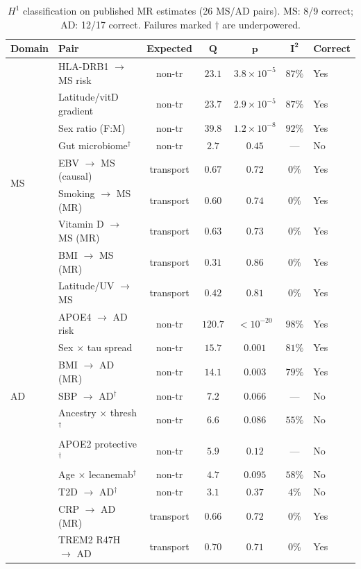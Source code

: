 \documentclass{article}
\begin{document}
\begin{table}[t]
\centering
\caption{$H^1$ classification on published MR estimates (26 MS/AD pairs). MS: 8/9 correct; AD: 12/17 correct. Failures marked $\dagger$ are underpowered.}
\label{tab:realdata-h1}
\small
\begin{tabular}{@{}llccccl@{}}
\toprule
\textbf{Domain} & \textbf{Pair} & \textbf{Expected} & $\boldsymbol{Q}$ & $\boldsymbol{p}$ & $\boldsymbol{I^2}$ & \textbf{Correct} \\
\midrule
\multirow{9}{*}{MS}
& HLA-DRB1 $\to$ MS risk & non-tr & $23.1$ & $3.8 \times 10^{-5}$ & $87\%$ & Yes \\
& Latitude/vitD gradient & non-tr & $23.7$ & $2.9 \times 10^{-5}$ & $87\%$ & Yes \\
& Sex ratio (F:M) & non-tr & $39.8$ & $1.2 \times 10^{-8}$ & $92\%$ & Yes \\
& Gut microbiome$^\dagger$ & non-tr & $2.7$ & $0.45$ & --- & No \\
& EBV $\to$ MS (causal) & transport & $0.67$ & $0.72$ & $0\%$ & Yes \\
& Smoking $\to$ MS (MR) & transport & $0.60$ & $0.74$ & $0\%$ & Yes \\
& Vitamin D $\to$ MS (MR) & transport & $0.63$ & $0.73$ & $0\%$ & Yes \\
& BMI $\to$ MS (MR) & transport & $0.31$ & $0.86$ & $0\%$ & Yes \\
& Latitude/UV $\to$ MS & transport & $0.42$ & $0.81$ & $0\%$ & Yes \\
\midrule
\multirow{7}{*}{AD}
& APOE4 $\to$ AD risk & non-tr & $120.7$ & $< 10^{-20}$ & $98\%$ & Yes \\
& Sex $\times$ tau spread & non-tr & $15.7$ & $0.001$ & $81\%$ & Yes \\
& BMI $\to$ AD (MR) & non-tr & $14.1$ & $0.003$ & $79\%$ & Yes \\
& SBP $\to$ AD$^\dagger$ & non-tr & $7.2$ & $0.066$ & --- & No \\
& Ancestry $\times$ thresh$^\dagger$ & non-tr & $6.6$ & $0.086$ & $55\%$ & No \\
& APOE2 protective$^\dagger$ & non-tr & $5.9$ & $0.12$ & --- & No \\
& Age $\times$ lecanemab$^\dagger$ & non-tr & $4.7$ & $0.095$ & $58\%$ & No \\
& T2D $\to$ AD$^\dagger$ & non-tr & $3.1$ & $0.37$ & $4\%$ & No \\
& CRP $\to$ AD (MR) & transport & $0.66$ & $0.72$ & $0\%$ & Yes \\
& TREM2 R47H $\to$ AD & transport & $0.70$ & $0.71$ & $0\%$ & Yes \\

\end{tabular}
\end{table}
\end{document}
